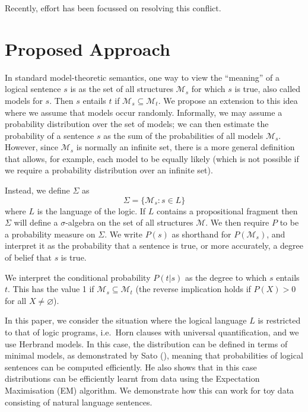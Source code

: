 \documentclass[letterpaper]{article}
\begin{document}
Recently, effort has been focussed on resolving this conflict.

\section{Proposed Approach}

In standard model-theoretic semantics, one way to view the ``meaning''
of a logical sentence $s$ is as the set of all structures
$\mathcal{M}_s$ for which $s$ is true, also called models for
$s$. Then $s$ entails $t$ if $\mathcal{M}_s \subseteq
\mathcal{M}_t$. We propose an extension to this idea where we assume
that models occur randomly. Informally, we may assume a probability
distribution over the set of models; we can then estimate the
probability of a sentence $s$ as the sum of the probabilities of all
models $\mathcal{M}_s$. However, since $\mathcal{M}_s$ is normally an
infinite set, there is a more general definition that allows, for
example, each model to be equally likely (which is not possible if we
require a probability distribution over an infinite set).

Instead, we define $\Sigma$ as
$$\Sigma = \{\mathcal{M}_s : s \in L\}$$
where $L$ is the language of the logic. If $L$ contains a
propositional fragment then $\Sigma$ will define a $\sigma$-algebra on
the set of all structures $\mathcal{M}$. We then require $P$ to be a
probability measure on $\Sigma$. We write $P(s)$ as shorthand for
$P(\mathcal{M}_s)$, and interpret it as the probability that a sentence
is true, or more accurately, a degree of belief that $s$ is true.

We interpret the conditional probability $P(t|s)$ as the degree to
which $s$ entails $t$. This has the value 1 if $\mathcal{M}_s
\subseteq \mathcal{M}_t$ (the reverse implication holds if $P(X) >
0$ for all $X \neq \varnothing$).

In this paper, we consider the situation where the logical language
$L$ is restricted to that of logic programs, i.e.~Horn clauses with
universal quantification, and we use Herbrand models. In this case,
the distribution can be defined in terms of minimal models, as
demonstrated by Sato (\citeyear{Sato:95}), meaning that probabilities
of logical sentences can be computed efficiently. He also shows that
in this case distributions can be efficiently learnt from data using
the Expectation Maximisation (EM) algorithm. We demonstrate how this
can work for toy data consisting of natural language sentences.
\end{document}
